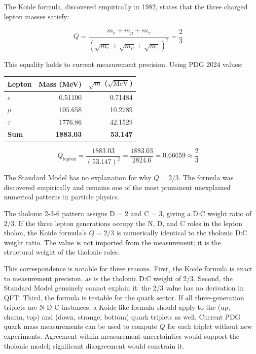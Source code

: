 \documentclass[12pt]{article}
\begin{document}
The Koide formula, discovered empirically in 1982, states that the three
charged lepton masses satisfy:

\[Q = \frac{m_e + m_\mu + m_\tau}{(\sqrt{m_e} + \sqrt{m_\mu} + \sqrt{m_\tau})^2} = \frac{2}{3}\]

This equality holds to current measurement precision. Using PDG 2024
values:

\begin{longtable}[]{@{}lrr@{}}
\toprule\noalign{}
Lepton & Mass (MeV) & \(\sqrt{m}\) (\(\sqrt{\text{MeV}}\)) \\
\midrule\noalign{}
\endhead
\bottomrule\noalign{}
\endlastfoot
\(e\) & 0.51100 & 0.71484 \\
\(\mu\) & 105.658 & 10.2789 \\
\(\tau\) & 1776.86 & 42.1529 \\
\textbf{Sum} & \textbf{1883.03} & \textbf{53.147} \\
\end{longtable}

\[Q_\text{lepton} = \frac{1883.03}{(53.147)^2} = \frac{1883.03}{2824.6} = 0.66659 \approx \frac{2}{3}\]

The Standard Model has no explanation for why \(Q = 2/3\). The formula
was discovered empirically and remains one of the most prominent
unexplained numerical patterns in particle physics.

The tholonic 2-3-6 pattern assigns D = 2 and C = 3, giving a D:C weight
ratio of \(2/3\). If the three lepton generations occupy the N, D, and C
roles in the lepton tholon, the Koide formula's \(Q = 2/3\) is
numerically identical to the tholonic D:C weight ratio. The value is not
imported from the measurement; it is the structural weight of the
tholonic roles.

This correspondence is notable for three reasons. First, the Koide
formula is exact to measurement precision, as is the tholonic D:C weight
of 2/3. Second, the Standard Model genuinely cannot explain it: the 2/3
value has no derivation in QFT. Third, the formula is testable for the
quark sector. If all three-generation triplets are N-D-C instances, a
Koide-like formula should apply to the (up, charm, top) and (down,
strange, bottom) quark triplets as well. Current PDG quark mass
measurements can be used to compute \(Q\) for each triplet without new
experiments. Agreement within measurement uncertainties would support
the tholonic model; significant disagreement would constrain it.
\end{document}
